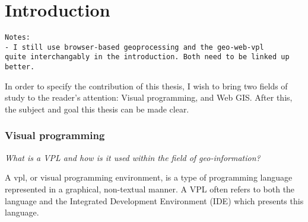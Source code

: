 \chapter{Introduction}

\begin{lstlisting}
Notes: 
- I still use browser-based geoprocessing and the geo-web-vpl 
quite interchangably in the introduction. Both need to be linked up better.

\end{lstlisting}



In order to specify the contribution of this thesis, I wish to bring two fields of study to the reader's attention: Visual programming, and Web GIS. 
After this, the subject and goal this thesis can be made clear.

\subsection*{Visual programming}

\emph{What is a VPL and how is it used within the field of geo-information?}

A \ac{vpl}, or visual programming environment, is a type of programming language represented in a graphical, non-textual manner.
A VPL often refers to both the language and the Integrated Development Environment (IDE) which presents this language.


